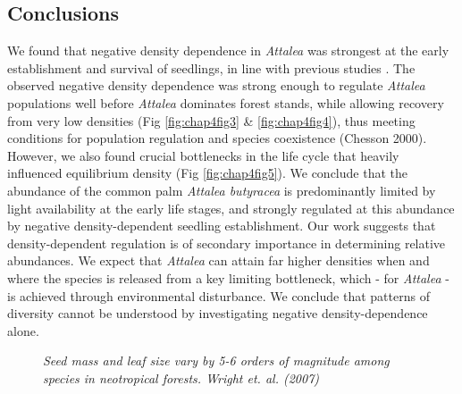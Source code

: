 \documentclass[b5paper,justified]{tufte-book} %
\begin{document}
\begin{fullwidth}
\subsection{Conclusions}
We found that negative density dependence in \textit{Attalea} was strongest at the early establishment and survival of seedlings, in line with previous studies \citep{Bagchi2010, Comita2014}. The observed negative density dependence was strong enough to regulate \textit{Attalea} populations well before \textit{Attalea} dominates forest stands, while allowing recovery from very low densities (Fig \ref{fig:chap4fig3} \& \ref{fig:chap4fig4}), thus meeting conditions for population regulation and species coexistence (Chesson 2000).  However, we also found crucial bottlenecks in the life cycle that heavily influenced equilibrium density (Fig \ref{fig:chap4fig5}). We conclude that the abundance of the common palm \textit{Attalea butyracea} is predominantly limited by light availability at the early life stages, and strongly regulated at this abundance by negative density-dependent seedling establishment. Our work suggests that density-dependent regulation is of secondary importance in determining relative abundances. We expect that \textit{Attalea} can attain far higher densities when and where the species is released from a key limiting bottleneck, which - for \textit{Attalea} - is achieved through environmental disturbance.  We conclude that patterns of diversity cannot be understood by investigating negative density-dependence alone.
\end{fullwidth}


\vspace*{20cm}

\begin{landscape}
\begin{figure}
\vspace*{-.6cm}\hspace*{4.4cm}
\hspace*{5cm}\begin{minipage}{18cm} 
\textit{ \footnotesize Seed mass and leaf size vary by 5-6 orders of magnitude
among species in neotropical forests. Wright \textit{et. al.} (2007) \nocite{Wright2007}}
\end{minipage}
\end{figure}
\end{landscape}
	
\end{document}
